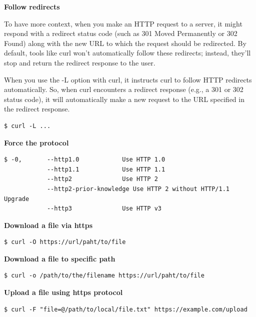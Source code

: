 \documentclass{article}
\newenvironment{codetemplate}[1][]{%
  \mybasecolorbox[#1]
  \itshape
}{%
  \endmybasecolorbox
}
\begin{document}
\textbf{Follow redirects}

To have more context, when you make an HTTP request to a server, it might respond with a redirect status code (such as 301 Moved Permanently or 302 Found) along with the new URL to which the request should be redirected. By default, tools like curl won't automatically follow these redirects; instead, they'll stop and return the redirect response to the user.

When you use the -L option with curl, it instructs curl to follow HTTP redirects automatically. So, when curl encounters a redirect response (e.g., a 301 or 302 status code), it will automatically make a new request to the URL specified in the redirect response.

\begin{codetemplate}{}
\begin{verbatim}
$ curl -L ...
\end{verbatim}
\end{codetemplate}

\textbf{Force the protocol}
\begin{codetemplate}{}
\begin{verbatim}
$ -0,       --http1.0            Use HTTP 1.0
            --http1.1            Use HTTP 1.1
            --http2              Use HTTP 2
            --http2-prior-knowledge Use HTTP 2 without HTTP/1.1 Upgrade
            --http3              Use HTTP v3
\end{verbatim}
\end{codetemplate}

\textbf{Download a file via https}
\begin{codetemplate}{}
\begin{verbatim}
$ curl -O https://url/paht/to/file
\end{verbatim}
\end{codetemplate}

\textbf{Download a file to specific path}
\begin{codetemplate}{}
\begin{verbatim}
$ curl -o /path/to/the/filename https://url/paht/to/file
\end{verbatim}
\end{codetemplate}

\textbf{Upload a file using https protocol}
\begin{codetemplate}{}
\begin{verbatim}
$ curl -F "file=@/path/to/local/file.txt" https://example.com/upload
\end{verbatim}
\end{codetemplate}
\end{document}
